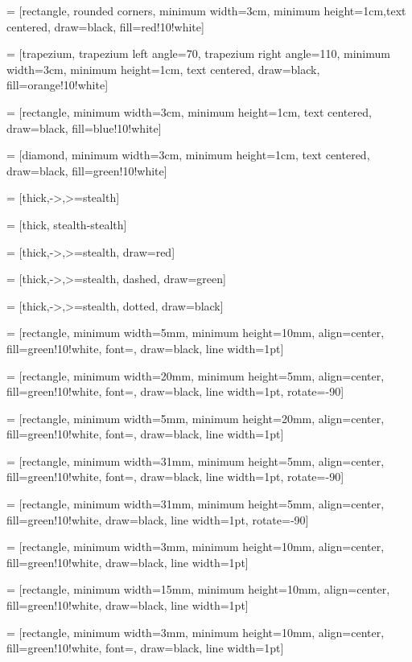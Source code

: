  = [rectangle, rounded corners, minimum width=3cm, minimum height=1cm,text centered, draw=black, fill=red!10!white]

 = [trapezium, trapezium left angle=70, trapezium right angle=110, minimum width=3cm, minimum height=1cm, text centered, draw=black, fill=orange!10!white]

 = [rectangle, minimum width=3cm, minimum height=1cm, text centered, draw=black, fill=blue!10!white]

 = [diamond, minimum width=3cm, minimum height=1cm, text centered, draw=black, fill=green!10!white]

 = [thick,->,>=stealth]

 = [thick, stealth-stealth]

  = [thick,->,>=stealth, draw=red]

  = [thick,->,>=stealth, dashed, draw=green]

  = [thick,->,>=stealth, dotted, draw=black]

 = [rectangle, minimum width=5mm, minimum height=10mm, align=center, fill=green!10!white, font=\footnotesize, draw=black, line width=1pt]

 = [rectangle, minimum width=20mm, minimum height=5mm, align=center, fill=green!10!white, font=\scriptsize, draw=black, line width=1pt, rotate=-90]

 = [rectangle, minimum width=5mm, minimum height=20mm, align=center, fill=green!10!white, font=\scriptsize, draw=black, line width=1pt]

 = [rectangle, minimum width=31mm, minimum height=5mm, align=center, fill=green!10!white, font=\small, draw=black, line width=1pt, rotate=-90]

 = [rectangle, minimum width=31mm, minimum height=5mm, align=center, fill=green!10!white, draw=black, line width=1pt, rotate=-90]

 = [rectangle, minimum width=3mm, minimum height=10mm, align=center, fill=green!10!white, draw=black, line width=1pt]

 = [rectangle, minimum width=15mm, minimum height=10mm, align=center, fill=green!10!white, draw=black, line width=1pt]

 = [rectangle, minimum width=3mm, minimum height=10mm, align=center, fill=green!10!white, font=\footnotesize, draw=black, line width=1pt]

